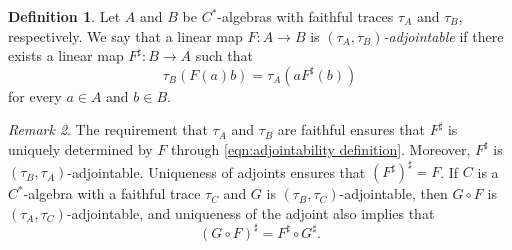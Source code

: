 \documentclass[11pt, a4paper, oneside, final, reqno]{amsart}
\theoremstyle{definition}
\newtheorem{definition}{Definition}[section]
\theoremstyle{plain}
\theoremstyle{remark}
\newtheorem{remark}[definition]{Remark}
\numberwithin{equation}{section}
\begin{document}
\begin{definition}\label{def:adjointability}
    Let $A$ and $B$ be $C^*$-algebras with faithful traces $\tau_A$ and $\tau_B$, respectively. We say that a linear map $F \colon A \to B$ is \emph{$(\tau_A,\tau_B)$-adjointable} if there exists a linear map $F^\sharp \colon B \to A$ such that
    \begin{equation}\label{eqn:adjointability definition}
        \tau_B(F(a)b) = \tau_A(aF^\sharp(b))
    \end{equation}
    for every $a \in A$ and $b \in B$.
\end{definition}

\begin{remark}\label{rem:uniqueness-of-sharp}
    The requirement that $\tau_A$ and $\tau_B$ are faithful ensures that $F^\sharp$ is uniquely determined by $F$ through \eqref{eqn:adjointability definition}. Moreover, $F^\sharp$ is $(\tau_B,\tau_A)$-adjointable. Uniqueness of adjoints ensures that $(F^\sharp)^\sharp = F$. If $C$ is a $C^*$-algebra with a faithful trace $\tau_C$ and $G$ is $(\tau_B,\tau_C)$-adjointable, then $G \circ F$ is $(\tau_A, \tau_C)$-adjointable, and uniqueness of the adjoint also implies that
    \begin{equation}\label{eqn:adjoint of composition}
        (G \circ F)^\sharp = F^\sharp \circ G^\sharp.
    \end{equation}
\end{remark}
\end{document}
